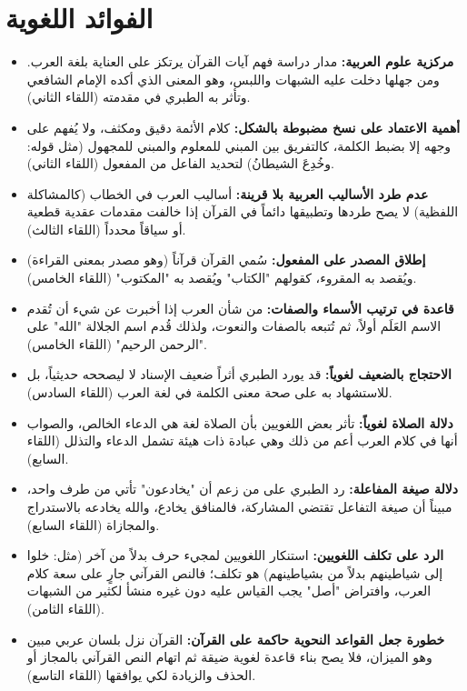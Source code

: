 \section{الفوائد اللغوية}
\begin{itemize}
    \item \textbf{مركزية علوم العربية:} مدار دراسة فهم آيات القرآن يرتكز على العناية بلغة العرب. ومن جهلها دخلت عليه الشبهات واللبس، وهو المعنى الذي أكده الإمام الشافعي وتأثر به الطبري في مقدمته (اللقاء الثاني).
    \item \textbf{أهمية الاعتماد على نسخ مضبوطة بالشكل:} كلام الأئمة دقيق ومكثف، ولا يُفهم على وجهه إلا بضبط الكلمة، كالتفريق بين المبني للمعلوم والمبني للمجهول (مثل قوله: وخُدِعَ الشيطانُ) لتحديد الفاعل من المفعول (اللقاء الثاني).
    \item \textbf{عدم طرد الأساليب العربية بلا قرينة:} أساليب العرب في الخطاب (كالمشاكلة اللفظية) لا يصح طردها وتطبيقها دائماً في القرآن إذا خالفت مقدمات عقدية قطعية أو سياقاً محدداً (اللقاء الثالث).
    \item \textbf{إطلاق المصدر على المفعول:} سُمي القرآن قرآناً (وهو مصدر بمعنى القراءة) ويُقصد به المقروء، كقولهم "الكتاب" ويُقصد به "المكتوب" (اللقاء الخامس).
    \item \textbf{قاعدة في ترتيب الأسماء والصفات:} من شأن العرب إذا أخبرت عن شيء أن تُقدم الاسم العَلَم أولاً، ثم تُتبعه بالصفات والنعوت، ولذلك قُدم اسم الجلالة "الله" على "الرحمن الرحيم" (اللقاء الخامس).
    \item \textbf{الاحتجاج بالضعيف لغوياً:} قد يورد الطبري أثراً ضعيف الإسناد لا ليصححه حديثياً، بل للاستشهاد به على صحة معنى الكلمة في لغة العرب (اللقاء السادس).
    \item \textbf{دلالة الصلاة لغوياً:} تأثر بعض اللغويين بأن الصلاة لغة هي الدعاء الخالص، والصواب أنها في كلام العرب أعم من ذلك وهي عبادة ذات هيئة تشمل الدعاء والتذلل (اللقاء السابع).
    \item \textbf{دلالة صيغة المفاعلة:} رد الطبري على من زعم أن "يخادعون" تأتي من طرف واحد، مبيناً أن صيغة التفاعل تقتضي المشاركة، فالمنافق يخادع، والله يخادعه بالاستدراج والمجازاة (اللقاء السابع).
    \item \textbf{الرد على تكلف اللغويين:} استنكار اللغويين لمجيء حرف بدلاً من آخر (مثل: خلوا إلى شياطينهم بدلاً من بشياطينهم) هو تكلف؛ فالنص القرآني جارٍ على سعة كلام العرب، وافتراض "أصل" يجب القياس عليه دون غيره منشأ لكثير من الشبهات (اللقاء الثامن).
    \item \textbf{خطورة جعل القواعد النحوية حاكمة على القرآن:} القرآن نزل بلسان عربي مبين وهو الميزان، فلا يصح بناء قاعدة لغوية ضيقة ثم اتهام النص القرآني بالمجاز أو الحذف والزيادة لكي يوافقها (اللقاء التاسع).

\end{itemize}
